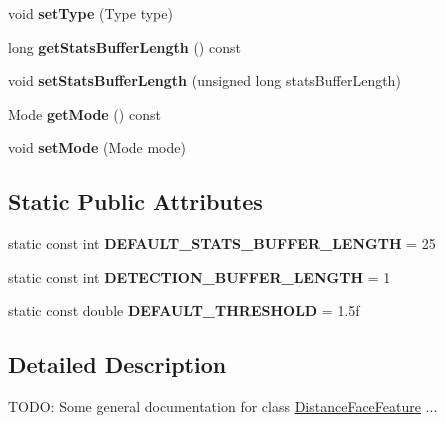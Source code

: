 \begin{DoxyCompactItemize}
\item 
void {\bfseries set\+Type} (Type type)\hypertarget{classinsight_1_1DistanceFaceFeature_a3323c04f4af88b7715c703bd92ff4ad0}{}\label{classinsight_1_1DistanceFaceFeature_a3323c04f4af88b7715c703bd92ff4ad0}

\item 
long {\bfseries get\+Stats\+Buffer\+Length} () const \hypertarget{classinsight_1_1DistanceFaceFeature_a8304c5c616850fd913455382bfab1fb6}{}\label{classinsight_1_1DistanceFaceFeature_a8304c5c616850fd913455382bfab1fb6}

\item 
void {\bfseries set\+Stats\+Buffer\+Length} (unsigned long stats\+Buffer\+Length)\hypertarget{classinsight_1_1DistanceFaceFeature_a20420d72f7098a53844f731724b4db20}{}\label{classinsight_1_1DistanceFaceFeature_a20420d72f7098a53844f731724b4db20}

\item 
Mode {\bfseries get\+Mode} () const \hypertarget{classinsight_1_1DistanceFaceFeature_afdb08aff9b4aca48ff23bd9d262c715b}{}\label{classinsight_1_1DistanceFaceFeature_afdb08aff9b4aca48ff23bd9d262c715b}

\item 
void {\bfseries set\+Mode} (Mode mode)\hypertarget{classinsight_1_1DistanceFaceFeature_a2529781df5ca1a424312c29b8e6483b8}{}\label{classinsight_1_1DistanceFaceFeature_a2529781df5ca1a424312c29b8e6483b8}

\end{DoxyCompactItemize}
\subsection*{Static Public Attributes}
\begin{DoxyCompactItemize}
\item 
static const int {\bfseries D\+E\+F\+A\+U\+L\+T\+\_\+\+S\+T\+A\+T\+S\+\_\+\+B\+U\+F\+F\+E\+R\+\_\+\+L\+E\+N\+G\+TH} = 25\hypertarget{classinsight_1_1DistanceFaceFeature_a97e3033abf485d3868f09d085f724c20}{}\label{classinsight_1_1DistanceFaceFeature_a97e3033abf485d3868f09d085f724c20}

\item 
static const int {\bfseries D\+E\+T\+E\+C\+T\+I\+O\+N\+\_\+\+B\+U\+F\+F\+E\+R\+\_\+\+L\+E\+N\+G\+TH} = 1\hypertarget{classinsight_1_1DistanceFaceFeature_a63b56e596e01d4c19c97c681051a5798}{}\label{classinsight_1_1DistanceFaceFeature_a63b56e596e01d4c19c97c681051a5798}

\item 
static const double {\bfseries D\+E\+F\+A\+U\+L\+T\+\_\+\+T\+H\+R\+E\+S\+H\+O\+LD} = 1.\+5f\hypertarget{classinsight_1_1DistanceFaceFeature_af0dfff888ce3f5abd0bf8f2398b203c9}{}\label{classinsight_1_1DistanceFaceFeature_af0dfff888ce3f5abd0bf8f2398b203c9}

\end{DoxyCompactItemize}


\subsection{Detailed Description}
T\+O\+DO\+: Some general documentation for class \hyperlink{classinsight_1_1DistanceFaceFeature}{Distance\+Face\+Feature} ... 